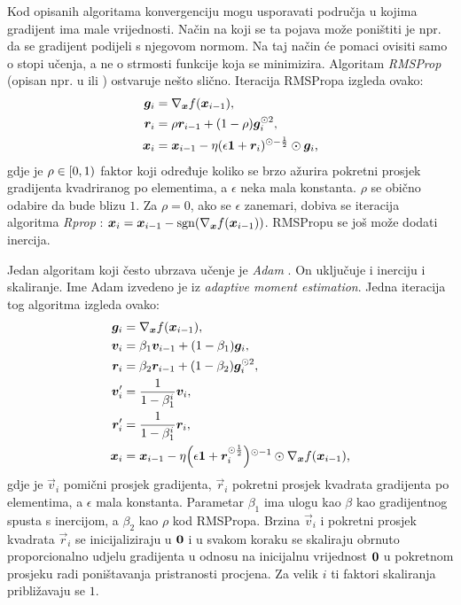 \documentclass[utf8, diplomski, lmodern]{fer}
\begin{document}
Kod opisanih algoritama konvergenciju mogu usporavati područja u kojima gradijent ima male vrijednosti. Način na koji se ta pojava može poništiti je npr. da se gradijent podijeli s njegovom normom. Na taj način će pomaci ovisiti samo o stopi učenja, a ne o strmosti funkcije koja se minimizira. Algoritam \emph{RMSProp} (opisan npr. u \citet{Hinton:2012:NNMLLOMBG} ili \citet{Ruder:2016:OGDOA}) ostvaruje nešto slično. Iteracija RMSPropa izgleda ovako:
\begin{align}
\vec g_i &= \nabla_{\vec x}f(\vec x_{i-1}), \\
\vec r_i &= \rho\vec r_{i-1} + (1-\rho)\vec g_i^{\odot 2}, \\
\vec x_i &= \vec x_{i-1} - \eta\del{\epsilon\cvec 1+\vec r_i}^{\odot-\frac{1}{2}} \odot \vec g_i \text{,}
\end{align}
gdje je $\rho\in\intco{0,1}$ faktor koji određuje koliko se brzo ažurira pokretni prosjek gradijenta kvadriranog po elementima, a $\epsilon$ neka mala konstanta. $\rho$ se obično odabire da bude blizu $1$. Za $\rho=0$, ako se $\epsilon$ zanemari, dobiva se iteracija algoritma \emph{Rprop} \citep{Hinton:2012:NNMLLOMBG}: $\vec x_i = \vec x_{i-1} - \sgn\del{\nabla_{\vec x}f(\vec x_{i-1})}$. RMSPropu se još može dodati inercija.

Jedan algoritam koji često ubrzava učenje je \emph{Adam} \citep{Kingma:2014:AMSO}. On uključuje i inerciju i skaliranje. Ime Adam izvedeno je iz \textit{adaptive moment estimation}. Jedna iteracija tog algoritma izgleda ovako:
\begin{align}
\vec g_i &= \nabla_{\vec x}f(\vec x_{i-1}), \\
\vec v_i &= \beta_1\vec v_{i-1} + (1-\beta_1)\vec g_i, \\
\vec r_i &= \beta_2\vec r_{i-1} + (1-\beta_2)\vec g_i^{\odot 2}, \\
\vec v'_i &= \frac{1}{1-\beta_1^i}\vec v_i, \\
\vec r'_i &= \frac{1}{1-\beta_1^i}\vec r_i, \\
\vec x_i &= \vec x_{i-1} - \eta\del{\epsilon\cvec 1+\vec r_i^{\odot\frac{1}{2}}}^{\odot-1} \odot \nabla_{\vec x}f(\vec x_{i-1}) \text{,}
\end{align}
gdje je $\vec v_i$ pomični prosjek gradijenta, $\vec r_i$ pokretni prosjek kvadrata gradijenta po elementima, a $\epsilon$ mala konstanta. Parametar $\beta_1$ ima ulogu kao $\beta$ kao gradijentnog spusta s inercijom, a $\beta_2$ kao $\rho$ kod RMSPropa. Brzina $\vec v_i$ i pokretni prosjek kvadrata $\vec r_i$ se inicijaliziraju u $\mathbf{0}$ i u svakom koraku se skaliraju obrnuto proporcionalno udjelu gradijenta u odnosu na inicijalnu vrijednost $\mathbf{0}$ u pokretnom prosjeku radi poništavanja pristranosti procjena. Za velik $i$ ti faktori skaliranja približavaju se $1$.
\end{document}
